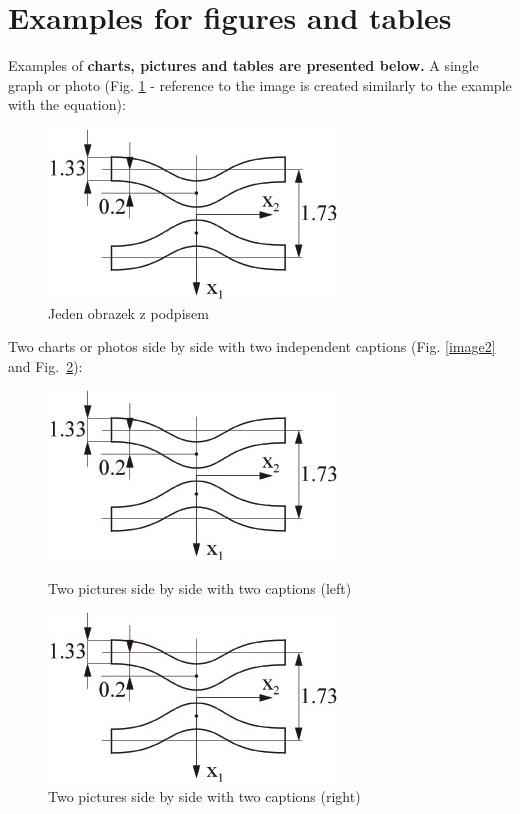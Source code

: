 \documentclass[polish,twoside]{article}
\begin{document}
\section{Examples for figures and tables}

Examples of \textbf{charts, pictures and tables are presented below.}
A single graph or photo (Fig. \ref{image1} - reference to the image is created similarly to the example with the equation):
\begin{figure}[h!]
\centering
\includegraphics[width=0.3\linewidth]{figure1.jpg}
\caption{Jeden obrazek z podpisem}\label{image1}
\end{figure}

\noindent Two charts or photos side by side with two independent captions (Fig. \ref {image2} and Fig.~\ref{image3}):

\begin{figure}[htb]
\centering
\begin{minipage}[t]{0.42\linewidth}
\centering
\includegraphics[width=0.65\linewidth]{figure1.jpg}
\caption{Two pictures side by side with two captions (left)}\label{image2}
\end{minipage}
\quad
\begin{minipage}[t]{0.42\linewidth}
\centering
\includegraphics[width=0.65\linewidth]{figure1.jpg}
\caption{Two pictures side by side with two captions (right)}\label{image3}
\end{minipage}
\end{figure}
\end{document}
